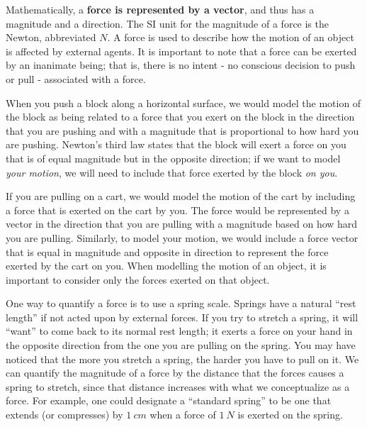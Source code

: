 Mathematically, a \textbf{force is represented by a vector}, and thus has a magnitude and a direction. The SI unit for the magnitude of a force is the Newton, abbreviated $\si{N}$. A force is used to describe how the motion of an object is affected by external agents. It is important to note that a force can be exerted by an inanimate being; that is, there is no intent - no conscious decision to push or pull - associated with a force.

When you push a block along a horizontal surface, we would model the motion of the block as being related to a force that you exert on the block in the direction that you are pushing and with a magnitude that is proportional to how hard you are pushing. Newton's third law states that the block will exert a force on you that is of equal magnitude but in the opposite direction; if we want to model \textit{your motion}, we will need to include that force exerted by the block \textit{on you}. 

If you are pulling on a cart, we would model the motion of the cart by including a force that is exerted on the cart by you. The force would be represented by a vector in the direction that you are pulling with a magnitude based on how hard you are pulling. Similarly, to model your motion, we would include a force vector that is equal in magnitude and opposite in direction to represent the force exerted by the cart on you. When modelling the motion of an object, it is important to consider only the forces exerted on that object.

One way to quantify a force is to use a spring scale. Springs have a natural ``rest length'' if not acted upon by external forces. If you try to stretch a spring, it will ``want'' to come back to its normal rest length; it exerts a force on your hand in the opposite direction from the one you are pulling on the spring. You may have noticed that the more you stretch a spring, the harder you have to pull on it. We can quantify the magnitude of a force by the distance that the forces causes a spring to stretch, since that distance increases with what we conceptualize as a force. For example, one could designate a ``standard spring'' to be one that extends (or compresses) by $\SI{1}{cm}$ when a force of $\SI{1}{N}$ is exerted on the spring. 

